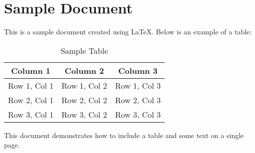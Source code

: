 \documentclass[a4paper,12pt]{article}
\begin{document}
\section*{Sample Document}

This is a sample document created using \LaTeX. Below is an example of a table:

\begin{table}[h!]
\centering
\begin{tabular}{|c|c|c|}
\hline
\textbf{Column 1} & \textbf{Column 2} & \textbf{Column 3} \\ \hline
Row 1, Col 1      & Row 1, Col 2      & Row 1, Col 3      \\ \hline
Row 2, Col 1      & Row 2, Col 2      & Row 2, Col 3      \\ \hline
Row 3, Col 1      & Row 3, Col 2      & Row 3, Col 3      \\ \hline
\end{tabular}
\caption{Sample Table}
\label{tab:sample_table}
\end{table}

This document demonstrates how to include a table and some text on a single page.
\end{document}
